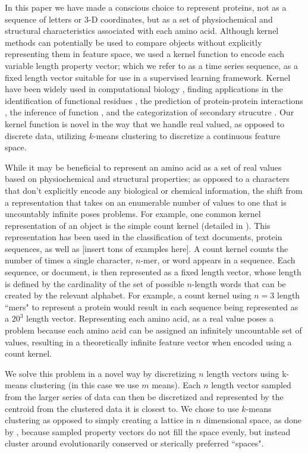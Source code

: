 In this paper we have made a conscious choice to represent proteins, not as a sequence of letters or 3-D coordinates, but as a set of physiochemical and structural characteristics associated with each amino acid.  Although kernel methods can potentially be used to compare objects without explicitly representing them in feature space, we used a kernel function to encode each variable length property vector; which we refer to as a time series sequence, as a fixed length vector suitable for use in a supervised learning framework.  Kernel have been widely used in computational biology \citep{schoolkopf2004kernel}, finding applications in the identification of functional residues \citep{Vacic2010,Xin2011}, the prediction of protein-protein interactions \citep{BenHur2005}, the inference of function \citep{Vert2002,DeBie2007}, and the categorization of secondary strucutre \citep{Leslie2002}.  Our kernel function is novel in the way that we handle real valued, as opposed to discrete data, utilizing $k$-means clustering to discretize a continuous feature space.

While it may be beneficial to represent an amino acid as a set of real values based on physiochemical and structural properties; as opposed to a characters that don't explicitly encode any biological or chemical information, the shift from a representation that takes on an enumerable number of values to one that is uncountably infinite poses problems.  For example, one common kernel representation of an object is the simple count kernel (detailed in ).  This representation has been used in the classification of text documents, protein sequences, as well as [insert tons of examples here].  A count kernel counts the number of times a single character, $n$-mer, or word appears in a sequence.  Each sequence, or document, is then represented as a fixed length vector, whose length is defined by the cardinality of the set of possible $n$-length words that can be created by the relevant alphabet.  For example, a count kernel using $n=3$ length ``mers" to represent a  protein would result in each sequence being represented as a $20^{3}$ length vector.  Representing each amino acid, as a real value poses a problem because each amino acid can be assigned an infinitely uncountable set of values, resulting in a theoretically infinite feature vector when encoded using a count kernel.  

We solve this problem in a novel way by discretizing $n$ length vectors using k-means clustering (in this case we use $m$ means).  Each $n$ length vector sampled from the larger series of data can then be discretized and represented by the centroid from the clustered data it is closest to.  We chose to use $k$-means clustering as opposed to simply creating a lattice in $n$ dimensional space, as done by \citet{Tuytelaars2007}, because sampled property vectors do not fill the space evenly, but instead cluster around evolutionarily conserved or sterically preferred ``spaces".

